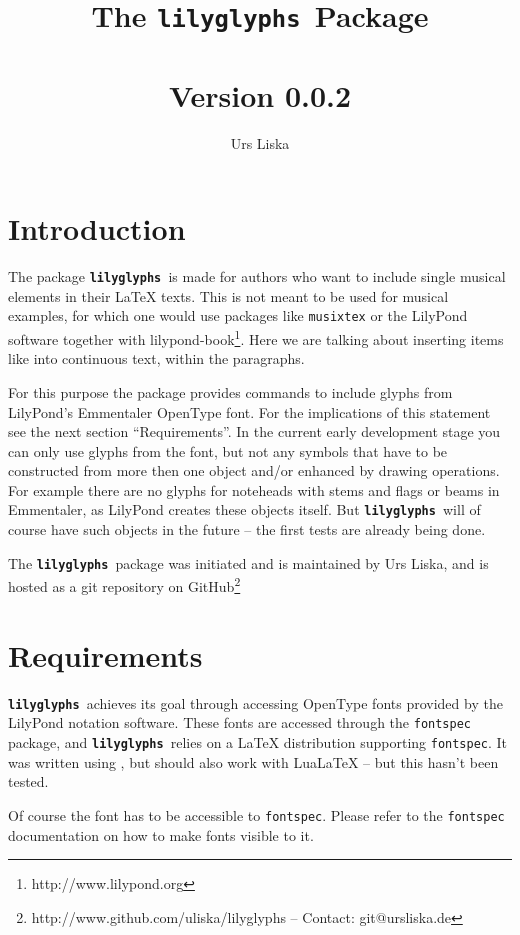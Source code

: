 \documentclass{article}
\newcommand{\lilyglyphs}{\texttt{\textbf{lilyglyphs\,}}}
\begin{document}
\title{The \lilyglyphs Package\\~\\
	\normalsize Version 0.0.2}
\author{Urs Liska}

\maketitle
\tableofcontents


\section{Introduction}
The package \lilyglyphs is made for authors who want to include single musical elements in their \LaTeX{} texts. This is not meant to be used for musical examples, for which one would use packages like \texttt{musixtex} or the LilyPond software together with lilypond-book\footnote{http://www.lilypond.org}. Here we are talking about inserting items like \lilyRFZ* into continuous text, within the paragraphs.

For this purpose the package provides commands to include glyphs from LilyPond's Emmentaler OpenType font. For the implications of this statement see the next section \enquote{Requirements}. In the current early development stage you can only use glyphs from the font, but not any symbols that have to be constructed from more then one object and/or enhanced by drawing operations. For example there are no glyphs for noteheads with stems and flags or beams in Emmentaler, as LilyPond creates these objects itself. But \lilyglyphs will of course have such objects in the future -- the first tests are already being done.

The \lilyglyphs package was initiated and is maintained by Urs Liska, and is hosted as a git repository on GitHub\footnote{http://www.github.com/uliska/lilyglyphs -- Contact: git@ursliska.de}

\section{Requirements}
\lilyglyphs achieves its goal through accessing OpenType fonts provided by the LilyPond notation software. These fonts are accessed through the \texttt{fontspec} package, and \lilyglyphs relies on a \LaTeX{} distribution supporting \texttt{fontspec}. It was written using \XeLaTeX, but should also work with LuaLaTeX -- but this hasn't been tested.

Of course the font has to be accessible to \texttt{fontspec}. Please refer to the \texttt{fontspec} documentation on how to make fonts visible to it. 
\end{document}
